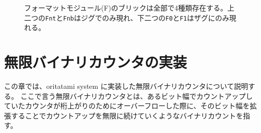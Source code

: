 \documentclass[a4,11pt]{article}
\begin{document}
\begin{figure}[p]
  \centering
 \caption{フォーマットモジュール(F)のブリックは全部で4種類存在する。上二つの\texttt{Fnt}と\texttt{Fnb}はジグでのみ現れ、下二つの\texttt{F0}と\texttt{F1}はザグにのみ現れる。}
 \label{fig:formatters}
\end{figure}
%
%
\newpage

\section{無限バイナリカウンタの実装}
この章では、oritatami system に実装した無限バイナリカウンタについて説明する。
ここで言う無限バイナリカウンタとは、あるビット幅でカウントアップしていたカウンタが桁上がりのためにオーバーフローした際に、そのビット幅を拡張することでカウントアップを無限に続けていくようなバイナリカウントを指す。
\end{document}
